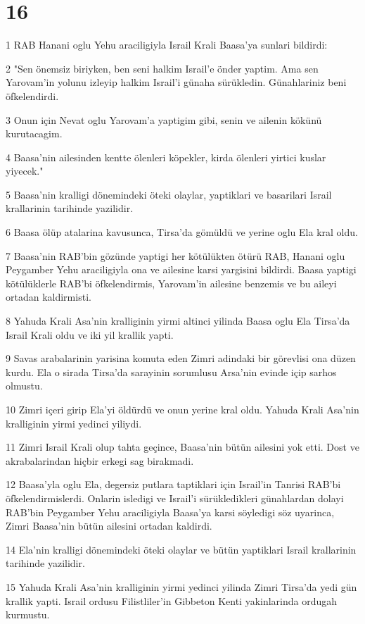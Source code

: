 \chapter{16}

\par 1 RAB Hanani oglu Yehu araciligiyla Israil Krali Baasa'ya sunlari bildirdi:
\par 2 "Sen önemsiz biriyken, ben seni halkim Israil'e önder yaptim. Ama sen Yarovam'in yolunu izleyip halkim Israil'i günaha sürükledin. Günahlariniz beni öfkelendirdi.
\par 3 Onun için Nevat oglu Yarovam'a yaptigim gibi, senin ve ailenin kökünü kurutacagim.
\par 4 Baasa'nin ailesinden kentte ölenleri köpekler, kirda ölenleri yirtici kuslar yiyecek."
\par 5 Baasa'nin kralligi dönemindeki öteki olaylar, yaptiklari ve basarilari Israil krallarinin tarihinde yazilidir.
\par 6 Baasa ölüp atalarina kavusunca, Tirsa'da gömüldü ve yerine oglu Ela kral oldu.
\par 7 Baasa'nin RAB'bin gözünde yaptigi her kötülükten ötürü RAB, Hanani oglu Peygamber Yehu araciligiyla ona ve ailesine karsi yargisini bildirdi. Baasa yaptigi kötülüklerle RAB'bi öfkelendirmis, Yarovam'in ailesine benzemis ve bu aileyi ortadan kaldirmisti.
\par 8 Yahuda Krali Asa'nin kralliginin yirmi altinci yilinda Baasa oglu Ela Tirsa'da Israil Krali oldu ve iki yil krallik yapti.
\par 9 Savas arabalarinin yarisina komuta eden Zimri adindaki bir görevlisi ona düzen kurdu. Ela o sirada Tirsa'da sarayinin sorumlusu Arsa'nin evinde içip sarhos olmustu.
\par 10 Zimri içeri girip Ela'yi öldürdü ve onun yerine kral oldu. Yahuda Krali Asa'nin kralliginin yirmi yedinci yiliydi.
\par 11 Zimri Israil Krali olup tahta geçince, Baasa'nin bütün ailesini yok etti. Dost ve akrabalarindan hiçbir erkegi sag birakmadi.
\par 12 Baasa'yla oglu Ela, degersiz putlara taptiklari için Israil'in Tanrisi RAB'bi öfkelendirmislerdi. Onlarin isledigi ve Israil'i sürükledikleri günahlardan dolayi RAB'bin Peygamber Yehu araciligiyla Baasa'ya karsi söyledigi söz uyarinca, Zimri Baasa'nin bütün ailesini ortadan kaldirdi.
\par 14 Ela'nin kralligi dönemindeki öteki olaylar ve bütün yaptiklari Israil krallarinin tarihinde yazilidir.
\par 15 Yahuda Krali Asa'nin kralliginin yirmi yedinci yilinda Zimri Tirsa'da yedi gün krallik yapti. Israil ordusu Filistliler'in Gibbeton Kenti yakinlarinda ordugah kurmustu.
